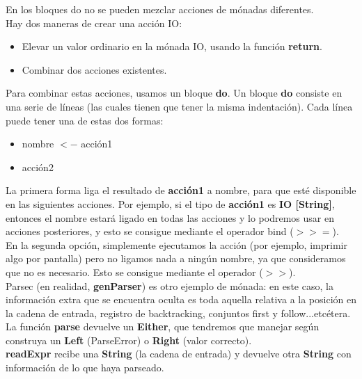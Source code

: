 En los bloques do no se pueden mezclar acciones de m\'onadas diferentes.\\

Hay dos maneras de crear una acci\'on IO:\\

\begin{itemize}
  \item Elevar un valor ordinario en la m\'onada IO, usando la funci\'on \textbf{return}.
  \item Combinar dos acciones existentes.
\end{itemize}

Para combinar estas acciones, usamos un bloque \textbf{do}. Un bloque \textbf{do} consiste en una serie de l\'ineas (las cuales tienen que tener la misma indentaci\'on). Cada l\'inea puede tener una de estas dos formas:

\begin{itemize}
  \item nombre $<-$ acci\'on1
  \item acci\'on2
\end{itemize}

La primera forma liga el resultado de \textbf{acci\'on1} a nombre, para que est\'e disponible en las siguientes acciones. Por ejemplo, si el tipo de \textbf{acci\'on1} es \textbf{IO [String]}, entonces el nombre estar\'a ligado en todas las acciones y lo podremos usar en acciones posteriores, y esto se consigue mediante el operador bind ($>>=$).\\

En la segunda opci\'on, simplemente ejecutamos la acci\'on (por ejemplo, imprimir algo por pantalla) pero no ligamos nada a ning\'un nombre, ya que consideramos que no es necesario. Esto se consigue mediante el operador ($>>$).\\

Parsec (en realidad, \textbf{genParser}) es otro ejemplo de m\'onada: en este caso, la informaci\'on extra que se encuentra oculta es toda aquella relativa a la posici\'on en la cadena de entrada, registro de backtracking, conjuntos first y follow...etc\'etera.\\

La funci\'on \textbf{parse} devuelve un \textbf{Either}, que tendremos que manejar seg\'un construya un \textbf{Left} (ParseError) o \textbf{Right} (valor correcto).\\

\textbf{readExpr} recibe una \textbf{String} (la cadena de entrada) y devuelve otra \textbf{String} con informaci\'on de lo que haya parseado.\\

